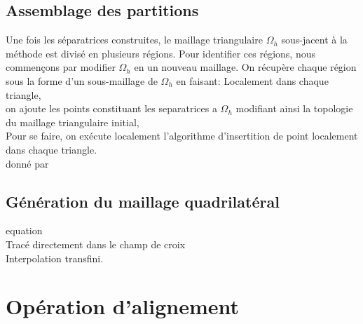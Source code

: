 \subsection{Assemblage des partitions}

Une fois les séparatrices construites, le maillage triangulaire $\Omega_h$ sous-jacent à la méthode est divisé en plusieurs régions. Pour identifier ces régions, nous commençons par modifier $\Omega_h$ en un nouveau maillage. On récupère chaque région sous la forme d'un sous-maillage de $\Omega_h$ en faisant:
Localement dans chaque triangle,\\
on ajoute les points constituant les separatrices a $\Omega_h$ modifiant ainsi la topologie du maillage triangulaire initial,\\
Pour se faire, on exécute localement l'algorithme d'insertition de point localement dans chaque triangle.\\
donné par\\

\subsection{Génération du maillage quadrilatéral}

equation\\
Tracé directement dans le champ de croix\\
Interpolation transfini.

\section{Opération d'alignement}

